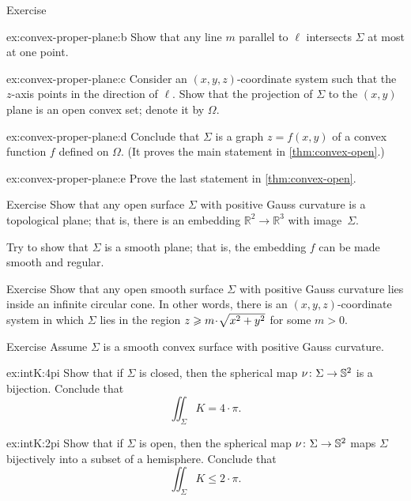 {\begin{thm}{Exercise}
\begin{subthm}{ex:convex-proper-plane:b}
Show that any line $m$ parallel to $\ell$ intersects $\Sigma$ at most at one point.
\end{subthm}


\begin{subthm}{ex:convex-proper-plane:c}
Consider an $(x,y,z)$-coordinate system such that the $z$-axis points in the direction of $\ell$.
Show that the projection of $\Sigma$ to the $(x,y)$ plane is an open convex set; denote it by $\Omega$.
\end{subthm}

\begin{subthm}{ex:convex-proper-plane:d}
Conclude that $\Sigma$ is a graph $z=f(x,y)$ of a convex function $f$ defined on $\Omega$.
(It proves the main statement in \ref{thm:convex-open}.)
\end{subthm}

\begin{subthm}{ex:convex-proper-plane:e}
Prove the last statement in \ref{thm:convex-open}.
\end{subthm}


\end{thm}



}

\begin{thm}{Exercise}\label{ex:open+convex=plane}
Show that any open surface $\Sigma$ with positive Gauss curvature is a topological plane;
that is, there is an embedding $\mathbb{R}^2\to\mathbb{R}^3$ with image~$\Sigma$.

Try to show that $\Sigma$ is a smooth plane;
that is, the embedding $f$ can be made smooth and regular.
\end{thm}

\begin{thm}{Exercise}\label{ex:circular-cone}
Show that any open smooth surface $\Sigma$ with positive Gauss curvature
lies inside an infinite circular cone. In other words, there is an $(x,y,z)$-coordinate system in which $\Sigma$ lies in the region $z \z\ge m \cdot\sqrt{x^2 + y^2}$ for some $m > 0$.
\end{thm} 

\begin{thm}{Exercise}\label{ex:intK}
Assume $\Sigma$ is a smooth convex surface with positive Gauss curvature.

\begin{subthm}{ex:intK:4pi}
Show that if $\Sigma$ is closed, then the spherical map $\nu\colon\Sigma\to \mathbb{S}^2$ is a bijection. Conclude that 
\[\iint_\Sigma K=4\cdot\pi.\]
\end{subthm}

\begin{subthm}{ex:intK:2pi}
Show that if $\Sigma$ is open, then  the spherical map $\nu\colon\Sigma\to \mathbb{S}^2$
maps $\Sigma$ bijectively into a subset of a hemisphere. Conclude that 
\[\iint_\Sigma K\le 2\cdot\pi.\]
\end{subthm}

\end{thm}



